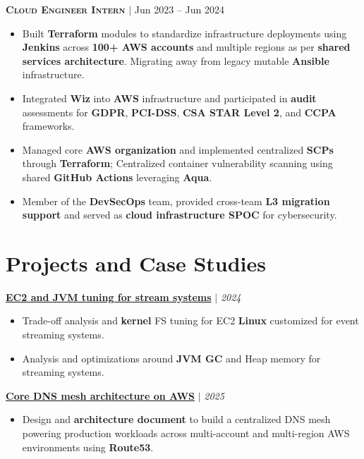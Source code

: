\documentclass[12pt,a4paper]{article}
\newcommand{\resumeRole}[2]{%
  \vspace{3pt}
  \textbf{\textsc{#1}} $\mid$ #2
}
\newcommand{\resumeProject}[3]{%
  \vspace{2pt}
  \textbf{\href{#2}{#1}} $\mid$ \textit{#3}
}
\begin{document}
\resumeRole{Cloud Engineer Intern}{Jun 2023 -- Jun 2024}
\begin{itemize}
    \item Built \textbf{Terraform} modules to standardize infrastructure deployments using \textbf{Jenkins} across \textbf{100+ AWS accounts} and multiple regions as per \textbf{shared services architecture}. Migrating away from legacy mutable \textbf{Ansible} infrastructure.
    \item Integrated \textbf{Wiz} into \textbf{AWS} infrastructure and participated in \textbf{audit} assessments for \textbf{GDPR}, \textbf{PCI-DSS}, \textbf{CSA STAR Level 2}, and \textbf{CCPA} frameworks.
    \item Managed core \textbf{AWS organization} and implemented centralized \textbf{SCPs} through \textbf{Terraform}; Centralized container vulnerability scanning using shared \textbf{GitHub Actions} leveraging \textbf{Aqua}.
    \item Member of the \textbf{DevSecOps} team, provided cross-team \textbf{L3 migration support} and served as \textbf{cloud infrastructure SPOC} for cybersecurity.
\end{itemize}

\section*{Projects and Case Studies}

\resumeProject{EC2 and JVM tuning for stream systems}
{https://github.com/om22shree/personal-website/blob/master/articles/kafka_linux_jvm_tuning.pdf}
{2024}
\begin{itemize}
    \item Trade-off analysis and \textbf{kernel} FS tuning for EC2 \textbf{Linux} customized for event streaming systems.
    \item Analysis and optimizations around \textbf{JVM GC} and Heap memory for streaming systems.
\end{itemize}

\resumeProject{Core DNS mesh architecture on AWS}{https://github.com/om22shree/personal-website/blob/master/articles/DNS_design.pdf}{2025}
\begin{itemize}
    \item Design and \textbf{architecture document} to build a centralized DNS mesh powering production workloads across multi-account and multi-region AWS environments using \textbf{Route53}.
\end{itemize}
\end{document}
